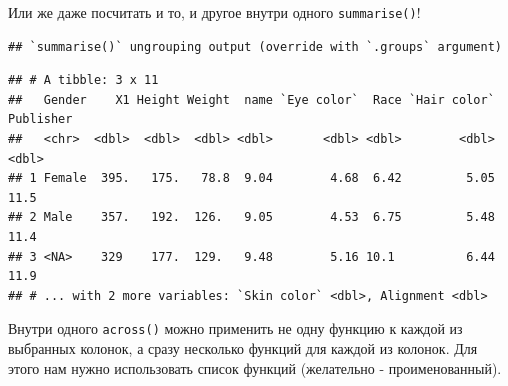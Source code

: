 \documentclass[]{book}
\newenvironment{Shaded}{\begin{snugshade}}{\end{snugshade}}
\newcommand{\KeywordTok}[1]{\textcolor[rgb]{0.13,0.29,0.53}{\textbf{#1}}}
\newcommand{\DataTypeTok}[1]{\textcolor[rgb]{0.13,0.29,0.53}{#1}}
\newcommand{\StringTok}[1]{\textcolor[rgb]{0.31,0.60,0.02}{#1}}
\newcommand{\OtherTok}[1]{\textcolor[rgb]{0.56,0.35,0.01}{#1}}
\newcommand{\ControlFlowTok}[1]{\textcolor[rgb]{0.13,0.29,0.53}{\textbf{#1}}}
\newcommand{\OperatorTok}[1]{\textcolor[rgb]{0.81,0.36,0.00}{\textbf{#1}}}
\newcommand{\NormalTok}[1]{#1}
\begin{document}
Или же даже посчитать и то, и другое внутри одного \texttt{summarise()}!

\begin{Shaded}
\end{Shaded}

\begin{verbatim}
## `summarise()` ungrouping output (override with `.groups` argument)
\end{verbatim}

\begin{verbatim}
## # A tibble: 3 x 11
##   Gender    X1 Height Weight  name `Eye color`  Race `Hair color` Publisher
##   <chr>  <dbl>  <dbl>  <dbl> <dbl>       <dbl> <dbl>        <dbl>     <dbl>
## 1 Female  395.   175.   78.8  9.04        4.68  6.42         5.05      11.5
## 2 Male    357.   192.  126.   9.05        4.53  6.75         5.48      11.4
## 3 <NA>    329    177.  129.   9.48        5.16 10.1          6.44      11.9
## # ... with 2 more variables: `Skin color` <dbl>, Alignment <dbl>
\end{verbatim}

Внутри одного \texttt{across()} можно применить не одну функцию к каждой
из выбранных колонок, а сразу несколько функций для каждой из колонок.
Для этого нам нужно использовать список функций (желательно -
проименованный).

\begin{Shaded}
\end{Shaded}
\end{document}

